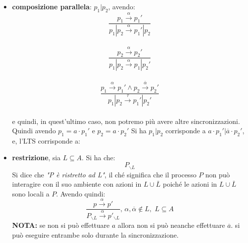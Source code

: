 \begin{itemize}
\begin{itemize}
\begin{esempio}
\begin{center}
    \end{center}
  \end{esempio}
  \end{itemize}
  \item \textbf{composizione parallela}: $p_1|p_2$, avendo:
  \[\frac{p_1\stackrel{\alpha}{\rightarrow}p_1'}{p_1|p_2
      \stackrel{\alpha}{\rightarrow}p_1'|p_2}\]\\
  \[\frac{p_2\stackrel{\alpha}{\rightarrow}p_2'}{p_1|p_2
      \stackrel{\alpha}{\rightarrow}p_1|p_2'}\]\\
  \[\frac{p_1\stackrel{\alpha}{\rightarrow}p_1'\land p_2
      \stackrel{\overline{\alpha}}{\rightarrow}p_2'}{p_1|p_2
      \stackrel{\tau}{\rightarrow}p_1'|p_2'}\]\\
  e quindi, in quest'ultimo caso, non potremo più avere altre
  sincronizzazioni. \\
  Quindi avendo $p_1=a\cdot p_1'$ e $p_2=a\cdot p_2'$ Si ha $p_1|p_2$
  corrisponde a $a\cdot p_1'|\overline{a}\cdot p_2'$, e, l'LTS corrisponde a:
  \begin{center}
  \end{center}
  \item \textbf{restrizione}, sia $L\subseteq A$. Si ha che:
  \[P_{\backslash L}\]
  Si dice che \textit{"P è ristretto ad L"}, il ché significa che il processo $P$ non può interagire con il suo ambiente con
  azioni in $L\cup \overline{L}$ poiché le azioni in $L\cup \overline{L}$ sono
  locali a $P$. Avendo quindi:
  \[\frac{p\stackrel{\alpha}{\rightarrow}p'}{P_{\backslash L}
      \stackrel{\alpha}{\rightarrow}p'_{\backslash L}}
    ,\,\alpha,\overline{\alpha}\not\in L,\,\, L\subseteq A\]
    \textbf{NOTA:} se non si può effettuare $a$ allora non si può neanche effettuare $\overline{a}$. si può eseguire entrambe solo durante la sincronizzazione.


\end{itemize}
